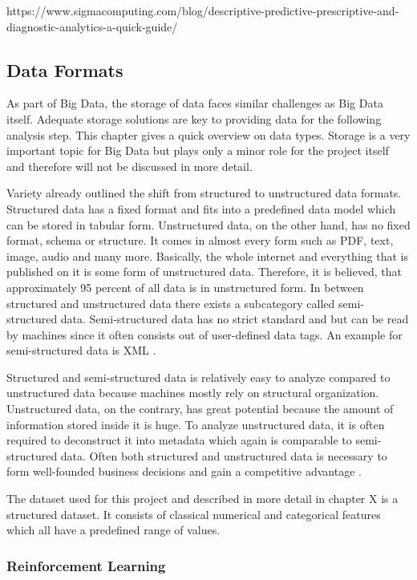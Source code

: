 https://www.sigmacomputing.com/blog/descriptive-predictive-prescriptive-and-diagnostic-analytics-a-quick-guide/

\subsection{Data Formats}

As part of Big Data, the storage of data faces similar challenges as Big Data itself. Adequate 
storage solutions are key to providing data for the following analysis step. This chapter gives 
a quick overview on data types. Storage is a very important topic for Big Data but plays only a 
minor role for the project itself and therefore will not be discussed in more detail.  

Variety already outlined the shift from structured to unstructured data formats. Structured data 
has a fixed format and fits into a predefined data model which can be stored in tabular form. 
Unstructured data, on the other hand, has no fixed format, schema or structure.  It comes in 
almost every form such as PDF, text, image, audio and many more. Basically, the whole internet 
and everything that is published on it is some form of unstructured data. Therefore, it is 
believed, that approximately 95 percent of all data is in unstructured form. In between structured 
and unstructured data there exists a subcategory called semi-structured data. Semi-structured 
data has no strict standard and but can be read by machines since it often consists out of 
user-defined data tags. An example for semi-structured data is XML \cite[p.2f]{Tanwar2015}. 

Structured and semi-structured data is relatively easy to analyze compared to unstructured data 
because machines mostly rely on structural organization. Unstructured data, on the contrary, has 
great potential because the amount of information stored inside it is huge. To analyze 
unstructured data, it is often required to deconstruct it into metadata which again is comparable 
to semi-structured data. Often both structured and unstructured data is necessary to form 
well-founded business decisions and gain a competitive advantage \cite[p.2f]{Tanwar2015}. 

The dataset used for this project and described in more detail in chapter X is a structured 
dataset. It consists of classical numerical and categorical features which all have a predefined 
range of values. 

\subsubsection{Reinforcement Learning}

